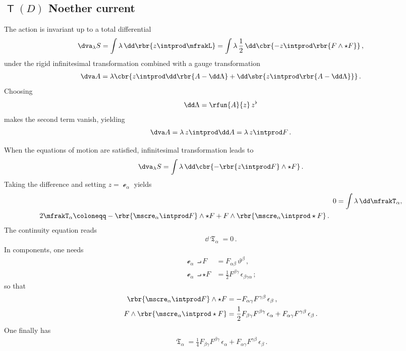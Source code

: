 \documentclass[a4paper]{article}
\begin{document}
\subsection[$T(D)$ Noether current]{$\msansT(D)$ Noether current}

The action is invariant up to a total differential
\begin{align}
\dva_{\lambda} S = \int \lambda\,\dd\rbr{z \intprod \mfrakL}
= \int \lambda\,\frac{1}{2}\,\dd\cbr{
	- z\intprod \rbr{F\wedge\star F} }\,,
\end{align}
under the rigid infinitesimal transformation combined with a gauge 
transformation \cite[eq.\ 3.46]{Scheck2017}
\begin{align}
\dva A = \lambda\cbr{z\intprod \dd \rbr{A-\dd\Lambda} + 
	\dd\sbr{z\intprod\rbr{A-\dd\Lambda}}}\,.
\end{align}
Choosing
\begin{align}
\dd\Lambda = \rfun{A}{z}\,z^{\flat}
\end{align}
makes the second term vanish, yielding
\begin{align}
\dva A = \lambda\,z\intprod \dd A = \lambda\,z\intprod F \,.
\end{align}

When the equations of motion are satisfied, infinitesimal 
transformation leads to
\begin{align}
\dva_{\lambda} S = \int \lambda\,\dd\cbr{-\rbr{z\intprod F}\wedge\star F}\,.
\end{align}
Taking the difference and setting $z = \mscre_{\alpha}$ yields
\begin{align}
0 &= \int \lambda\,\dd \mfrakT_{\alpha}, \\
\begin{split}
2 \mfrakT_{\alpha} &\coloneqq -\rbr{\mscre_{\alpha}\intprod F}\wedge\star F +
	F \wedge\rbr{\mscre_{\alpha}\intprod\star F}\,.
\end{split}
\end{align}
The continuity equation reads
\begin{align}
\dd \mfrakT_{\alpha} = 0\,.
\end{align}
In components, one needs
\begin{align}
\mscre_{\alpha}\intprod F &= F_{\alpha\beta}\,\vartheta^{\beta}\,,
\\
\mscre_{\alpha}\intprod \star F &=
	\frac{1}{2} F^{\beta\gamma}\,\epsilon_{\beta\gamma\alpha}\,;
\end{align}
so that
\begin{align}
\rbr{\mscre_{\alpha}\intprod F}\wedge \star F &=
	- F_{\alpha\gamma} F^{\gamma\beta}\,\epsilon_{\beta}\,,
\\
F\wedge\rbr{\mscre_{\alpha}\intprod\star F} &=
	\frac{1}{2} F_{\beta\gamma} F^{\beta\gamma}\,\epsilon_{\alpha} +
	F_{\alpha\gamma} F^{\gamma\beta}\,\epsilon_{\beta}\,.
\end{align}
One finally has
\begin{align}
\mfrakT_{\alpha} =
	\frac{1}{4} F_{\beta\gamma} F^{\beta\gamma}\,\epsilon_{\alpha} +
	F_{\alpha\gamma} F^{\gamma\beta}\,\epsilon_{\beta}\,.
\end{align}
\end{document}
